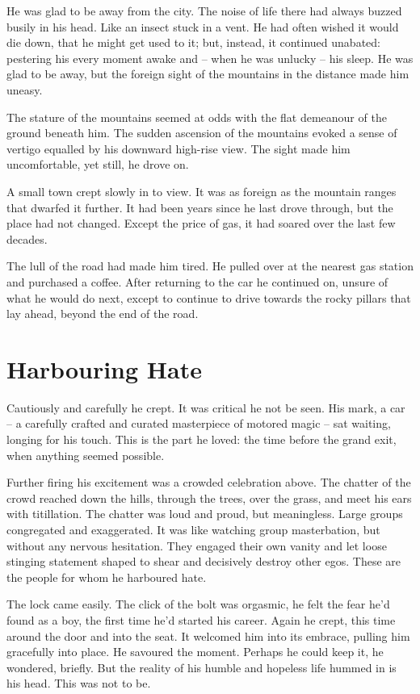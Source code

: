 \documentclass[fontsize=12pt,english]{scrreprt}
\begin{document}
He was glad to be away from the city. The noise of life there had
always buzzed busily in his head. Like an insect stuck in a vent. He
had often wished it would die down, that he might get used to it; but,
instead, it continued unabated: pestering his every moment awake and
-- when he was unlucky -- his sleep. He was glad to be away, but the
foreign sight of the mountains in the distance made him uneasy.

The stature of the mountains seemed at odds with the flat demeanour of
the ground beneath him. The sudden ascension of the mountains evoked a
sense of vertigo equalled by his downward high-rise view. The sight
made him uncomfortable, yet still, he drove on.

A small town crept slowly in to view. It was as foreign as the
mountain ranges that dwarfed it further. It had been years since he
last drove through, but the place had not changed. Except the price of
gas, it had soared over the last few decades.

The lull of the road had made him tired. He pulled over at the nearest
gas station and purchased a coffee. After returning to the car he
continued on, unsure of what he would do next, except to continue to
drive towards the rocky pillars that lay ahead, beyond the end of the
road.

\newpage

\section{Harbouring Hate}

Cautiously and carefully he crept. It was critical he not be seen. His
mark, a car -- a carefully crafted and curated masterpiece of motored
magic -- sat waiting, longing for his touch. This is the part he
loved: the time before the grand exit, when anything seemed
possible.

Further firing his excitement was a crowded celebration above. The
chatter of the crowd reached down the hills, through the trees, over
the grass, and meet his ears with titillation. The chatter was loud
and proud, but meaningless. Large groups congregated and
exaggerated. It was like watching group masterbation, but without any
nervous hesitation. They engaged their own vanity and let loose
stinging statement shaped to shear and decisively destroy other
egos. These are the people for whom he harboured hate.

The lock came easily. The click of the bolt was orgasmic, he felt the
fear he'd found as a boy, the first time he'd started his
career. Again he crept, this time around the door and into the
seat. It welcomed him into its embrace, pulling him gracefully into
place. He savoured the moment. Perhaps he could keep it, he wondered,
briefly. But the reality of his humble and hopeless life hummed in is
his head. This was not to be.
\end{document}
